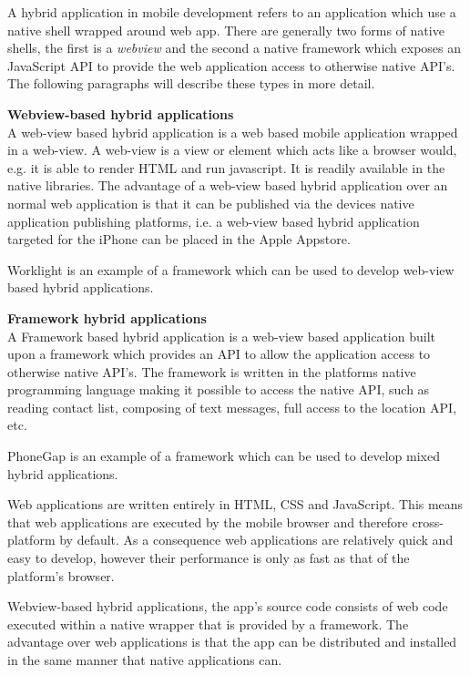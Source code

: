 
A hybrid application in mobile development refers to an application which use a native shell wrapped around web app. There are generally two forms of native shells, the first is a \emph{webview} and the second a native framework which exposes an JavaScript API to provide the web application access to otherwise native API's. The following paragraphs will describe these types in more detail.

{\bf Webview-based hybrid applications}\\
A web-view based hybrid application is a web based mobile application wrapped in a web-view. A web-view is a view or element which acts like a browser would, e.g. it is able to render HTML and run javascript.  It is readily available in the native libraries. The advantage of a web-view based hybrid application over an normal web application is that it can be published via the devices native application publishing platforms, i.e. a web-view based hybrid application targeted for the iPhone can be placed in the Apple Appstore. 

Worklight is an example of a framework which can be used to develop web-view based hybrid applications.

{\bf Framework hybrid applications}\\
A Framework based hybrid application is a web-view based application built upon a framework which provides an API to allow the application access to otherwise native API's. The framework is written in the platforms native programming language making it possible to access the native API, such as reading contact list, composing of text messages, full access to the location API, etc.

PhoneGap is an example of a framework which can be used to develop mixed hybrid applications.

Web applications are written entirely in HTML, CSS and JavaScript. This means that web applications are executed by the mobile browser and therefore cross-platform by default. As a consequence web applications are relatively quick and easy to develop, however their performance is only as fast as that of the platform's browser.

Webview-based hybrid applications, the app's source code consists of web code executed within a native wrapper that is provided by a framework. The advantage over web applications is that the app can be distributed and installed in the same manner that native applications can.
 
